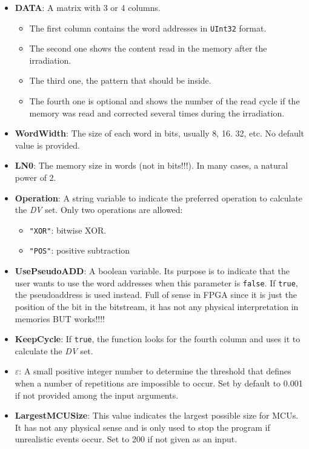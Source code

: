 \begin{itemize}
\begin{itemize}
 			\item   \textbf{DATA}: A matrix with 3 or 4 columns. 
 			\begin{itemize}
 				\item The first column contains the word addresses in \texttt{UInt32} format.
 				\item The second one shows the content read in the memory after the irradiation.
 				\item The third one, the pattern that should be inside.
 				\item  The fourth one is optional and shows the number of the read cycle if the   memory was read and corrected several times during the irradiation.
 			\end{itemize}
 			\item   \textbf{WordWidth}: The size of each word in bits, usually 8, 16. 32, etc. No default value is provided.
 			\item   \textbf{LN0}: The memory size in words (not in bits!!!). In many cases, a natural power of 2.
 			\item   \textbf{Operation}: A string variable to indicate the preferred operation to calculate
 			the \textit{DV} set. Only two operations are allowed: 
 			\begin{itemize}
 				\item \texttt{"XOR"}: bitwise XOR.
 				\item\texttt{"POS"}: positive subtraction
 			\end{itemize}
 			\item  \textbf{UsePseudoADD}: A boolean variable. Its purpose is to indicate that the user wants to use the word addresses when this parameter is \texttt{false}. If \texttt{true}, the pseudoaddress  is used instead. Full of sense in FPGA since it is just the position  of the bit in the bitstream, it has not any physical interpretation in memories BUT works!!!!
 			\item   \textbf{KeepCycle}: If \texttt{true}, the function looks for the fourth column and uses it to calculate the \textit{DV} set.
 			\item   \textbf{\(\varepsilon\)}: A small positive integer number to determine the threshold that defines when a number of repetitions are impossible to occur. Set by default to 0.001 if not provided among the input arguments.
 			\item  \textbf{LargestMCUSize}: This value indicates the largest possible size for MCUs. It has not any physical sense  and is only used to stop the program if unrealistic events occur. Set to 200 if not given as an input.
 			

\end{itemize}
\end{itemize}
